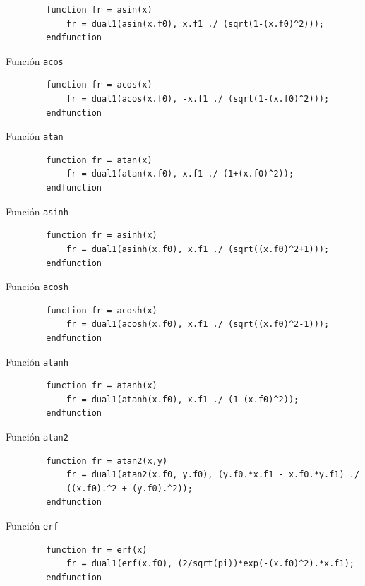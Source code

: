 \documentclass[a4paper, 12pt]{article}
\begin{document}
    \begin{verbatim}
        function fr = asin(x)
            fr = dual1(asin(x.f0), x.f1 ./ (sqrt(1-(x.f0)^2)));
        endfunction
    \end{verbatim}

    Función \verb|acos|

    \begin{verbatim}
        function fr = acos(x)
            fr = dual1(acos(x.f0), -x.f1 ./ (sqrt(1-(x.f0)^2)));
        endfunction
    \end{verbatim}

    Función \verb|atan|

    \begin{verbatim}
        function fr = atan(x)
            fr = dual1(atan(x.f0), x.f1 ./ (1+(x.f0)^2));
        endfunction
    \end{verbatim}

    Función \verb|asinh|

    \begin{verbatim}
        function fr = asinh(x)
            fr = dual1(asinh(x.f0), x.f1 ./ (sqrt((x.f0)^2+1)));
        endfunction
    \end{verbatim}

    Función \verb|acosh|

    \begin{verbatim}
        function fr = acosh(x)
            fr = dual1(acosh(x.f0), x.f1 ./ (sqrt((x.f0)^2-1)));
        endfunction
    \end{verbatim}

    Función \verb|atanh|

    \begin{verbatim}
        function fr = atanh(x)
            fr = dual1(atanh(x.f0), x.f1 ./ (1-(x.f0)^2));
        endfunction
    \end{verbatim}

    Función \verb|atan2|

    \begin{verbatim}
        function fr = atan2(x,y)
            fr = dual1(atan2(x.f0, y.f0), (y.f0.*x.f1 - x.f0.*y.f1) ./ 
            ((x.f0).^2 + (y.f0).^2));
        endfunction
    \end{verbatim}

    Función \verb|erf|

    \begin{verbatim}
        function fr = erf(x)
            fr = dual1(erf(x.f0), (2/sqrt(pi))*exp(-(x.f0)^2).*x.f1);
        endfunction
    \end{verbatim}
\end{document}
